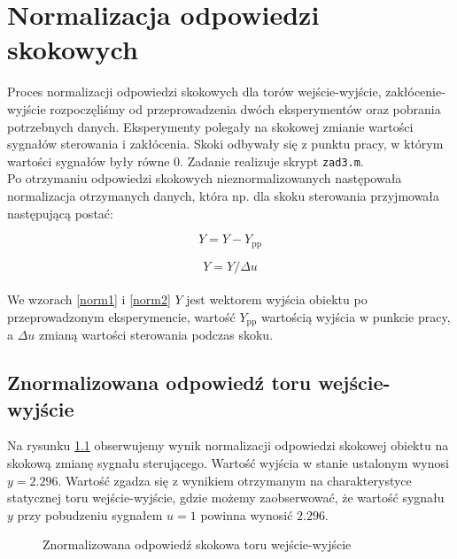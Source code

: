 \chapter{Normalizacja odpowiedzi skokowych}
\label{zad3}
Proces normalizacji odpowiedzi skokowych dla torów wejście-wyjście, zakłócenie-wyjście rozpoczęliśmy od przeprowadzenia dwóch eksperymentów oraz pobrania potrzebnych danych. Eksperymenty polegały na skokowej zmianie wartości sygnałów sterowania i zakłócenia. Skoki odbywały się z punktu pracy, w którym wartości sygnałów były równe 0. Zadanie realizuje skrypt \verb+zad3.m+.\\
\indent{} Po otrzymaniu odpowiedzi skokowych nieznormalizowanych następowała normalizacja otrzymanych danych, która np. dla skoku sterowania przyjmowała następującą postać:

\begin{equation}
\label{norm1}
Y = Y - Y_{\mathrm{pp}}
\end{equation}

\begin{equation}
\label{norm2}
Y = Y / \Delta u
\end{equation}
\\
We wzorach \ref{norm1} i \ref{norm2} $Y$ jest wektorem wyjścia obiektu po przeprowadzonym eksperymencie, wartość $Y_{\mathrm{pp}}$ wartością wyjścia w punkcie pracy, a $\Delta u$ zmianą wartości sterowania podczas skoku.

\section{Znormalizowana odpowiedź toru wejście-wyjście}
Na rysunku \ref{zad3_norm_odp_u} obserwujemy wynik normalizacji odpowiedzi skokowej obiektu na skokową zmianę sygnału sterującego. Wartość wyjścia w stanie ustalonym wynosi $y = \num{2,296}$. Wartość zgadza się z wynikiem otrzymanym na charakterystyce statycznej toru wejście-wyjście, gdzie możemy zaobserwować, że wartość sygnału $y$ przy pobudzeniu sygnałem $u = 1$ powinna wynosić $\num{2,296}$.   

\begin{figure}[t]
    \centering
    \caption{Znormalizowana odpowiedź skokowa toru wejście-wyjście}
    \label{zad3_norm_odp_u}
\end{figure}



